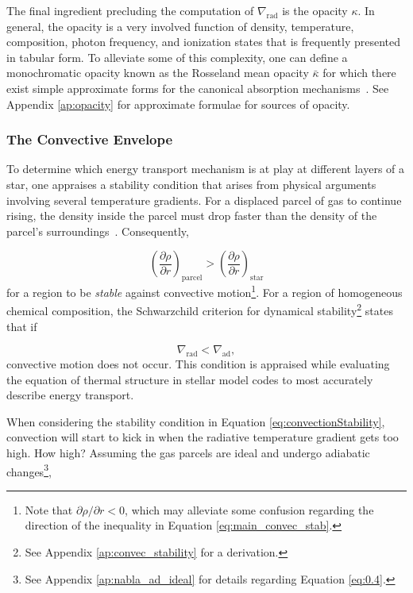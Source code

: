 \documentclass[12pt]{article}
\newcommand{\pderiv}[2]{\frac{\partial #1}{\partial #2}}
\newcommand{\bigparenthesis}[1]{\left(#1\right)}
\begin{document}
The final ingredient precluding the computation of $\nabla_\mathrm{rad}$ is the opacity $\kappa$. In general, the opacity is a very involved function of density, temperature, composition, photon frequency, and ionization states that is frequently presented in tabular form. To alleviate some of this complexity, one can define a monochromatic opacity known as the Rosseland mean opacity $\bar{\kappa}$ for which there exist simple approximate forms for the canonical absorption mechanisms~\cite{EracleousPSU}. See  Appendix \ref{ap:opacity} for approximate formulae for sources of opacity.

\subsubsection{The Convective Envelope}
To determine which energy transport mechanism is at play at different layers of a star, one appraises a stability condition that arises from physical arguments involving several temperature gradients. For a displaced parcel of gas to continue rising, the density inside the parcel must drop faster than the density of the parcel's surroundings~\cite{KWW_book}. Consequently,

\begin{equation}
    \bigparenthesis{\pderiv{\rho}{r}}_\mathrm{parcel} > \bigparenthesis{\pderiv{\rho}{r}}_\mathrm{star} \label{eq:main_convec_stab}
\end{equation}
%
for a region to be \textit{stable} against convective motion\footnote{Note that $\partial\rho/\partial r < 0$, which may alleviate some confusion regarding the direction of the inequality in Equation \ref{eq:main_convec_stab}.}. For a region of homogeneous chemical composition, the Schwarzchild criterion for dynamical stability\footnote{See Appendix \ref{ap:convec_stability} for a derivation.} states that if

\begin{equation}
    \nabla_\mathrm{rad} < \nabla_\mathrm{ad}, \label{eq:convectionStability}
\end{equation}
%
convective motion does not occur. This condition is appraised while evaluating the equation of thermal structure in stellar model codes to most accurately describe energy transport.

When considering the stability condition in Equation \ref{eq:convectionStability}, convection will start to kick in when the radiative temperature gradient gets too high. How high? Assuming the gas parcels are ideal and undergo adiabatic changes\footnote{See Appendix \ref{ap:nabla_ad_ideal} for details regarding Equation \ref{eq:0.4}.},
\end{document}
